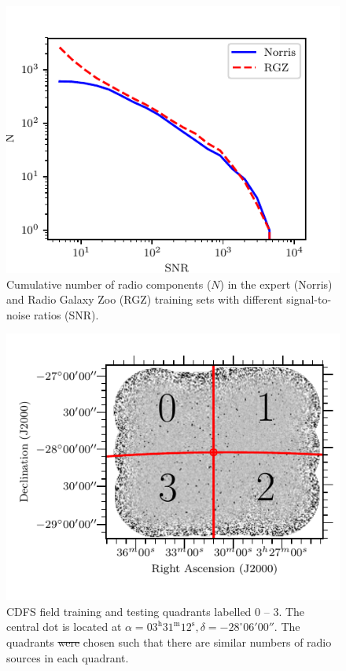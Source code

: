 \documentclass[11pt, a4paper]{book}
\providecommand{\DIFaddtex}[1]{{\protect\color{blue}\uwave{#1}}} %
\providecommand{\DIFdeltex}[1]{{\protect\color{red}\sout{#1}}}                      %
\providecommand{\DIFaddFL}[1]{\DIFadd{#1}} %
\providecommand{\DIFdelFL}[1]{\DIFdel{#1}} %
\providecommand{\DIFaddbeginFL}{} %
\providecommand{\DIFaddendFL}{} %
\providecommand{\DIFdelbeginFL}{} %
\providecommand{\DIFdelendFL}{} %
\providecommand{\DIFadd}[1]{\texorpdfstring{\DIFaddtex{#1}}{#1}} %
\providecommand{\DIFdel}[1]{\texorpdfstring{\DIFdeltex{#1}}{}} %
\newcommand{\DIFscaledelfig}{0.5}
\newlength{\DIFdelgraphicswidth} %
\newlength{\DIFdelgraphicsheight} %
\newcommand{\DIFaddincludegraphics}[2][]{{\color{blue}\fbox{\DIFOincludegraphics[#1]{#2}}}} %
\newcommand{\DIFdelincludegraphics}[2][]{%
\sbox{\DIFdelgraphicsbox}{\DIFOincludegraphics[#1]{#2}}%
\settoboxwidth{\DIFdelgraphicswidth}{\DIFdelgraphicsbox} %
\settoboxtotalheight{\DIFdelgraphicsheight}{\DIFdelgraphicsbox} %
\scalebox{\DIFscaledelfig}{%
\parbox[b]{\DIFdelgraphicswidth}{\usebox{\DIFdelgraphicsbox}\\[-\baselineskip] \rule{\DIFdelgraphicswidth}{0em}}\llap{\resizebox{\DIFdelgraphicswidth}{\DIFdelgraphicsheight}{%
\setlength{\unitlength}{\DIFdelgraphicswidth}%
\begin{picture}(1,1)%
\thicklines\linethickness{2pt} %
{\color[rgb]{1,0,0}\put(0,0){\framebox(1,1){}}}%
{\color[rgb]{1,0,0}\put(0,0){\line( 1,1){1}}}%
{\color[rgb]{1,0,0}\put(0,1){\line(1,-1){1}}}%
\end{picture}%
}\hspace*{3pt}}} %
} %
\DeclareRobustCommand{\DIFaddbeginFL}{\DIFOaddbeginFL \let\includegraphics\DIFaddincludegraphics} %
\DeclareRobustCommand{\DIFaddendFL}{\DIFOaddendFL \let\includegraphics\DIFOincludegraphics} %
\DeclareRobustCommand{\DIFdelbeginFL}{\DIFOdelbeginFL \let\includegraphics\DIFdelincludegraphics} %
\DeclareRobustCommand{\DIFdelendFL}{\DIFOaddendFL \let\includegraphics\DIFOincludegraphics} %
\begin{document}
    \begin{figure}
      \centering
      \includegraphics[width=0.6\columnwidth]{atlas-images/snr_cutoff_cumulative.pdf}
      \caption[Cumulative number of radio components in the expert and Radio Galaxy
        Zoo training sets with different signal-to-noise ratios.]{Cumulative number of radio components ($N$) in the expert (Norris) and Radio Galaxy
        Zoo (RGZ) training sets with different signal-to-noise ratios (SNR).}
      \label{fig:distribution-cutoffs}
    \end{figure}

    \begin{figure}
      \centering
      \includegraphics[width=0.6\columnwidth, trim={0cm 0.5cm 0cm 0.5cm}, clip]{atlas-images/quadrants.pdf}
      \caption[CDFS field training and testing quadrants.]{CDFS field training and testing quadrants labelled 0 -- 3. The
        central dot is located at $\alpha = 03^\text{h}31^\text{m}12^\text{s},
        \delta = -28^\circ{}06'00''$. The quadrants \DIFdelbeginFL \DIFdelFL{were }\DIFdelendFL \DIFaddbeginFL \DIFaddFL{are }\DIFaddendFL chosen such that
        there are similar numbers of radio sources in each
        quadrant.\label{fig:quadrants}}
    \end{figure}
\end{document}
